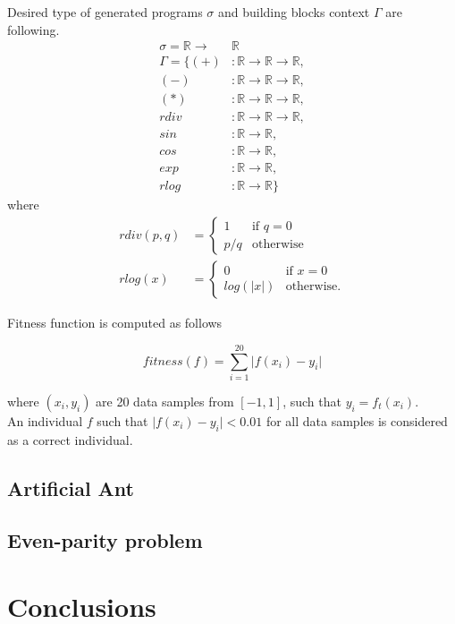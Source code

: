 \documentclass[conference]{IEEEtran}
\newcommand{\ar}{\rightarrow\xspace}
\newcommand{\Real}{\mathbb{R}}
\begin{document}
Desired type of generated programs $\sigma$ and 
building blocks context $\Gamma$ are following.
\begin{align*}
\sigma = \Real \ar &\Real\\
\Gamma = \{
  (+)  &: \Real \ar \Real \ar \Real    ,\\
  (-)  &: \Real \ar \Real \ar \Real    ,\\
  (*)  &: \Real \ar \Real \ar \Real    ,\\
  rdiv &: \Real \ar \Real \ar \Real    ,\\
  sin  &: \Real \ar \Real              ,\\
  cos  &: \Real \ar \Real              ,\\
  exp  &: \Real \ar \Real              ,\\ 
  rlog &: \Real \ar \Real              \}
\end{align*}
where
\begin{align*}
rdiv(p,q) &= \begin{cases} 1 &\mbox{if } q = 0 \\
p/q & \mbox{otherwise } \end{cases}  \\
rlog(x) &= \begin{cases} 0 &\mbox{if } x = 0 \\
log(\vert x\vert) & \mbox{otherwise}. \end{cases}
\end{align*}

Fitness function is computed as follows

$$ fitness(f) =  \sum\limits_{i=1}^{20}{ \vert f(x_i)-y_i }\vert   $$

where $(x_i,y_i)$ are 20 data samples from $[-1,1]$, such that $y_i = f_t(x_i)$.\\

An individual $f$ such that $\vert f(x_i)-y_i \vert < 0.01 $ for all data samples is 
considered as a correct individual.

\subsection{Artificial Ant}
\subsection{Even-parity problem}


\section{Conclusions}
\end{document}
